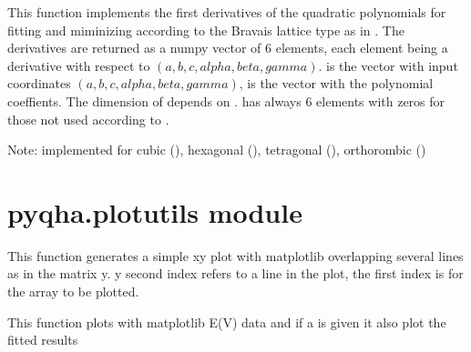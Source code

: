 \documentclass[letterpaper,10pt,english]{sphinxmanual}
\begin{document}

\begin{fulllineitems}
\label{pyqha:pyqha.minutils.fquartic_der}
This function implements the first derivatives of the quadratic polynomials 
for fitting and miminizing according to the Bravais lattice type as in . 
The derivatives are returned as a numpy vector of 6 elements, each element 
being a derivative with respect to \((a,b,c,alpha,beta,gamma)\).
 is the vector with input coordinates \((a,b,c,alpha,beta,gamma)\),
 is the vector
with the polynomial coeffients. The dimension of  depends on
.  has always 6 elements with zeros for those not used according to
.

Note: implemented for cubic (), hexagonal (), 
tetragonal (), orthorombic ()

\end{fulllineitems}



\section{pyqha.plotutils module}
\label{pyqha:module-pyqha.plotutils}\label{pyqha:pyqha-plotutils-module}

\begin{fulllineitems}
\label{pyqha:pyqha.plotutils.multiple_plot_xy}
This function generates a simple xy plot with matplotlib overlapping several
lines as in the matrix y. y second index refers to a line in the plot, the first 
index is for the array to be plotted.

\end{fulllineitems}


\begin{fulllineitems}
\label{pyqha:pyqha.plotutils.plot_EV}
This function plots with matplotlib E(V) data and if a is given it also plot
the fitted results

\end{fulllineitems}
\end{document}
